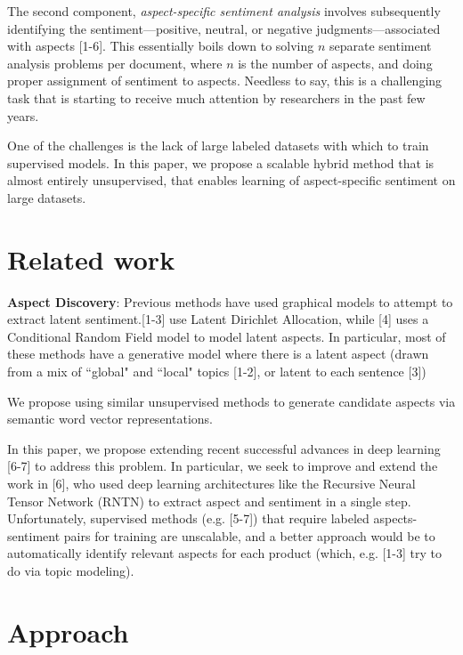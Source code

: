 \documentclass{article} %
\begin{document}
The second component, \textit{aspect-specific sentiment analysis} involves subsequently identifying the sentiment---positive, neutral, or negative judgments---associated with aspects [1-6]. This essentially boils down to solving $n$ separate sentiment analysis problems per document, where $n$ is the number of aspects, and doing proper assignment of sentiment to aspects. Needless to say, this is a challenging task that is starting to receive much attention by researchers in the past few years.

One of the challenges is the lack of large labeled datasets with which to train supervised models. In this paper, we propose a scalable hybrid method that is almost entirely unsupervised, that enables learning of aspect-specific sentiment on large datasets.





\section{Related work}

\textbf{Aspect Discovery}: Previous methods have used graphical models to attempt to extract latent sentiment.[1-3] use Latent Dirichlet Allocation, while [4] uses a Conditional Random Field model to model latent aspects. In particular, most of these methods have a generative model where there is a latent aspect (drawn from a mix of ``global" and ``local" topics [1-2], or latent to each sentence [3])

We propose using similar unsupervised methods to generate candidate aspects via semantic word vector representations. 

In this paper, we propose extending recent successful advances in deep learning [6-7] to address this problem. In particular, we seek to improve and extend the work in [6], who used deep learning architectures like the Recursive Neural Tensor Network (RNTN) to extract aspect and sentiment in a single step. Unfortunately, supervised methods (e.g. [5-7]) that require labeled aspects-sentiment pairs for training are unscalable, and a better approach would be to automatically identify relevant aspects for each product (which, e.g. [1-3] try to do via topic modeling). 




\section{Approach}
\end{document}
